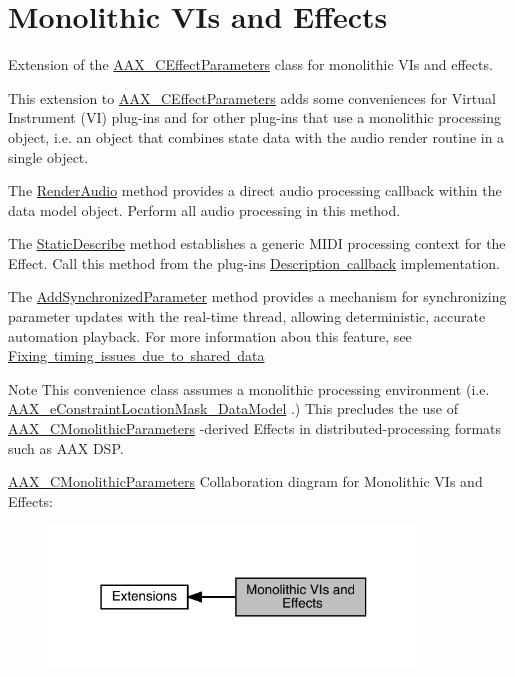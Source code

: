 \hypertarget{a00839}{}\section{Monolithic V\+Is and Effects}
\label{a00839}
Extension of the \mbox{\hyperlink{a01481}{A\+A\+X\+\_\+\+C\+Effect\+Parameters}} class for monolithic V\+Is and effects. 

This extension to \mbox{\hyperlink{a01481}{A\+A\+X\+\_\+\+C\+Effect\+Parameters}} adds some conveniences for Virtual Instrument (VI) plug-\/ins and for other plug-\/ins that use a monolithic processing object, i.\+e. an object that combines state data with the audio render routine in a single object.

\begin{DoxyItemize}
\item The \mbox{\hyperlink{a01969_a04f2f73d70ea28c17747c68fc3a20fc8}{Render\+Audio}} method provides a direct audio processing callback within the data model object. Perform all audio processing in this method. \item The \mbox{\hyperlink{a01969_a69f9b80a70ecc6b7b2a7eec372d2502a}{Static\+Describe}} method establishes a generic M\+I\+DI processing context for the Effect. Call this method from the plug-\/in\textquotesingle{}s \mbox{\hyperlink{a00796}{Description callback}} implementation. \item The \mbox{\hyperlink{a01969_a1b23573e8aa3f8e64c61813b721559c2}{Add\+Synchronized\+Parameter}} method provides a mechanism for synchronizing parameter updates with the real-\/time thread, allowing deterministic, accurate automation playback. For more information abou this feature, see \mbox{\hyperlink{a00821_parameterUpdateTiming_sharedData}{Fixing timing issues due to shared data}}\end{DoxyItemize}
\begin{DoxyNote}{Note}
This convenience class assumes a monolithic processing environment (i.\+e. \mbox{\hyperlink{a00491_a0c5d795c1fd021c5b9b541febc34601aa027df08c137702400a92719828bea44b}{A\+A\+X\+\_\+e\+Constraint\+Location\+Mask\+\_\+\+Data\+Model}} .) This precludes the use of \mbox{\hyperlink{a01969}{A\+A\+X\+\_\+\+C\+Monolithic\+Parameters}} -\/derived Effects in distributed-\/processing formats such as A\+AX D\+SP.
\end{DoxyNote}
\mbox{\hyperlink{a01969}{A\+A\+X\+\_\+\+C\+Monolithic\+Parameters}} Collaboration diagram for Monolithic V\+Is and Effects\+:
\nopagebreak
\begin{figure}[H]
\begin{center}
\leavevmode
\includegraphics[width=279pt]{a00839}
\end{center}
\end{figure}
